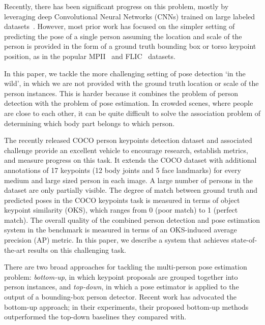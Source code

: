 \documentclass[10pt,twocolumn,letterpaper]{article}
\begin{document}
Recently, there has been significant progress on this problem, mostly by leveraging deep Convolutional Neural Networks (CNNs) trained on large labeled datasets~\cite{deeppose, jainiclr2014, tompsonnips2014, Chen_NIPS14, stackedhourglass, andriluka14cvpr, bulat2016, zisserman2016, chain16, deeper_cut, cmu_mscoco}. However, most prior work has focused on the simpler setting of predicting the pose of a single person assuming the location and scale of the person is provided in the form of a ground truth bounding box or torso keypoint position, as in the popular MPII~\cite{andriluka14cvpr} and FLIC~\cite{modec2013} datasets.

In this paper, we tackle the more challenging setting of pose detection `in the wild', in which we are not provided with the ground truth location or scale of the person instances. This is harder because it combines the problem of person detection with the problem of pose estimation. In crowded scenes, where people are close to each other, it can be quite difficult to solve the association problem of determining which body part belongs to which person.

The recently released COCO person keypoints detection dataset and associated challenge \cite{keypointchallenge} provide an excellent vehicle to encourage research, establish metrics, and measure progress on this task. It extends the COCO dataset \cite{lin2014microsoft} with additional annotations of 17 keypoints (12 body joints and 5 face landmarks) for every medium and large sized person in each image. A large number of persons in the dataset are only partially visible. The degree of match between ground truth and predicted poses in the COCO keypoints task is measured in terms of object keypoint similarity (OKS), which ranges from 0 (poor match) to 1 (perfect match). The overall quality of the combined person detection and pose estimation system in the benchmark is measured in terms of an OKS-induced average precision (AP) metric. In this paper, we describe a system that achieves state-of-the-art results on this challenging task.

There are two broad approaches for tackling the multi-person pose estimation problem: \emph{bottom-up}, in which keypoint proposals are grouped together into person instances, and \emph{top-down}, in which a pose estimator is applied to the output of a bounding-box person detector. Recent work \cite{deepcut, deeper_cut, cmu_mscoco, insafutdinov2016articulated} has advocated the bottom-up approach; in their experiments, their proposed bottom-up methods outperformed the top-down baselines they compared with.
\end{document}
